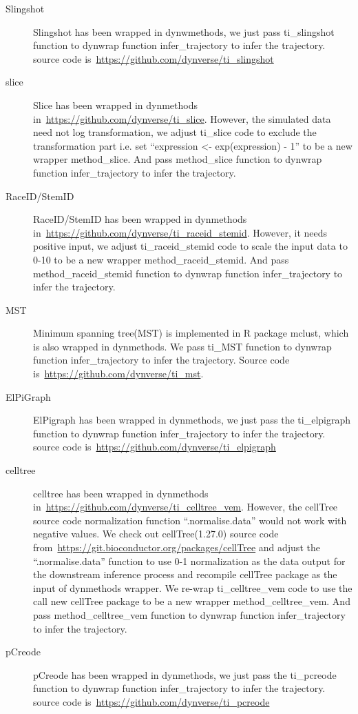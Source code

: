 \begin{description}
	\item[Slingshot]
	Slingshot has been wrapped in dynwmethods, we just pass ti\_slingshot function to dynwrap function infer\_trajectory to infer the trajectory. source code is~\url{https://github.com/dynverse/ti\_slingshot}

	\item[slice]
	Slice has been wrapped in dynmethods in~\url{https://github.com/dynverse/ti\_slice}. However, the simulated data need not log transformation, we adjust ti\_slice code to exclude the transformation part i.e. set ``expression <- exp(expression) - 1'' to be a new wrapper method\_slice. And pass method\_slice function to dynwrap function infer\_trajectory to infer the trajectory.

	\item[RaceID/StemID]
	RaceID/StemID has been wrapped in dynmethods in~\url{https://github.com/dynverse/ti\_raceid\_stemid}. However, it needs positive input, we adjust ti\_raceid\_stemid code to scale the input data to 0-10 to be a new wrapper method\_raceid\_stemid. And pass method\_raceid\_stemid function to dynwrap function infer\_trajectory to infer the trajectory.

	\item[MST]
	Minimum spanning tree(MST) is implemented in R package mclust, which is also wrapped in dynmethods. We pass ti\_MST function to dynwrap function infer\_trajectory to infer the trajectory. Source code is~\url{https://github.com/dynverse/ti\_mst}.

	\item[ElPiGraph]
	ElPigraph has been wrapped in dynmethods, we just pass the ti\_elpigraph function to dynwrap function infer\_trajectory to infer the trajectory. source code is~\url{https://github.com/dynverse/ti_elpigraph}

	\item[celltree]
	celltree has been wrapped in dynmethods in~\url{https://github.com/dynverse/ti\_celltree\_vem}. However, the cellTree source code normalization function ``.normalise.data'' would not work with negative values. We check out cellTree(1.27.0) source code from~\url{https://git.bioconductor.org/packages/cellTree} and adjust the ``.normalise.data'' function to use 0-1 normalization as the data output for the downstream inference process and recompile cellTree package as the input of dynmethods wrapper. We re-wrap ti\_celltree\_vem code to use the call new cellTree package to be a new wrapper method\_celltree\_vem. And pass method\_celltree\_vem function to dynwrap function infer\_trajectory to infer the trajectory.

	\item[pCreode]
	pCreode has been wrapped in dynmethods, we just pass the ti\_pcreode function to dynwrap function infer\_trajectory to infer the trajectory. source code is~\url{https://github.com/dynverse/ti\_pcreode}
\end{description}

